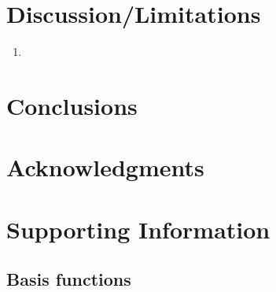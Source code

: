 \documentclass[11pt,a4paper]{article}
\begin{document}
\section{Discussion/Limitations}

\begin{enumerate}
	\item 
\end{enumerate}

\section{Conclusions}

\section{Acknowledgments}

\section{Supporting Information}

\subsection{Basis functions}
\end{document}
